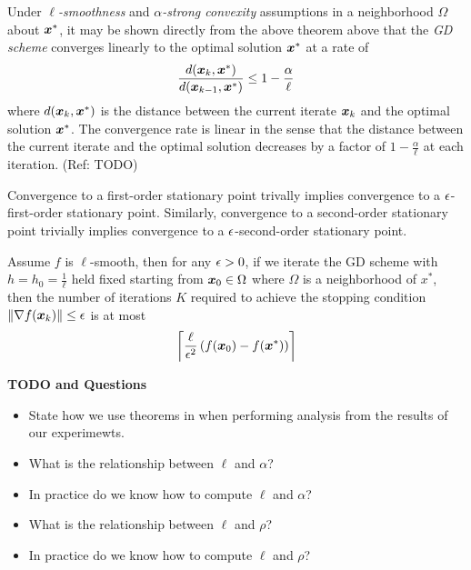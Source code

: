 \documentclass[10pt]{article}
\begin{document}
            \begin{remark}
                Under \emph{$\ell$-smoothness} and \emph{$\alpha$-strong convexity} assumptions
                in a neighborhood $\Omega$ about $\bm{x}^*$, it may be shown directly from 
                the above theorem above that the \emph{GD scheme} converges linearly to 
                the optimal solution $\bm{x}^*$ at a rate of
                $$
                    \frac{d(\bm{x}_k, \bm{x}^*)}{d(\bm{x}_{k-1}, \bm{x}^*)} \leq 1 - \frac{\alpha}{\ell}
                $$
                where $d(\bm{x}_k, \bm{x}^*)$ is the distance between the current iterate $\bm{x}_k$ and 
                the optimal solution $\bm{x}^*$. The convergence rate is linear in the sense that the 
                distance between the current iterate and the optimal solution decreases by a factor of 
                $1 - \frac{\alpha}{\ell}$ at each iteration. (Ref: TODO)
            \end{remark}

            \begin{remark}
                Convergence to a first-order stationary point trivally
                implies convergence to a $\epsilon$-first-order stationary point.
                Similarly, convergence to a second-order stationary point trivially
                implies convergence to a $\epsilon$-second-order stationary point.
            \end{remark}

            \medskip

            \begin{theorem}
                Assume $f$ is $\ell$-smooth, then for any $\epsilon > 0$, if we iterate
                the GD scheme with $h = h_0 = \frac{1}{\ell}$ held fixed starting from
                $\bm{x}_0 \in \Omega$ where $\Omega$ is a neighborhood of $x^*$,
                then the number of iterations $K$ required to achieve the stopping condition
                $\| \nabla f(\bm{x}_k) \| \leq \epsilon$ is at most
                $$
                    \left\lceil \frac{\ell}{\epsilon^{2}} \, (f(\bm{x}_0) - f(\bm{x}^*)) \right\rceil
                $$
            \end{theorem}

            \begin{remark}
                \textbf{TODO and Questions}
                \begin{itemize}
                    \item State how we use theorems in when performing analysis from
                    the results of our experimewts.
                    \item What is the relationship between $\ell$ and $\alpha$?
                    \item In practice do we know how to compute $\ell$ and $\alpha$?
                    \item What is the relationship between $\ell$ and $\rho$?
                    \item In practice do we know how to compute $\ell$ and $\rho$?
                \end{itemize}
            \end{remark}
\end{document}
